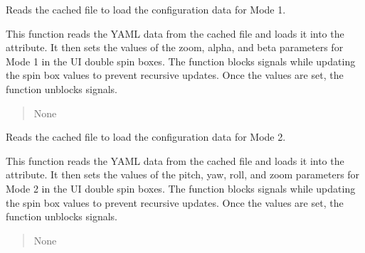 \documentclass[a4paper,10pt,english,openany, oneside]{sphinxmanual}
\begin{document}
\begin{fulllineitems}
\begin{fulllineitems}
\begin{quote}
\begin{description}
\end{description}\end{quote}

\end{fulllineitems}


\begin{fulllineitems}
\label{\detokenize{test:test.AnypointConfig.showing_config_mode_1}}
\pysigstartsignatures
{}
\pysigstopsignatures
\sphinxAtStartPar
Reads the cached file to load the configuration data for Mode 1.

\sphinxAtStartPar
This function reads the YAML data from the cached file and loads it into the
 attribute. It then sets the values of the zoom, alpha,
and beta parameters for Mode 1 in the UI double spin boxes. The function blocks
signals while updating the spin box values to prevent recursive updates. Once the
values are set, the function unblocks signals.
\begin{quote}\begin{description}
\sphinxAtStartPar
None

\end{description}\end{quote}

\end{fulllineitems}


\begin{fulllineitems}
\label{\detokenize{test:test.AnypointConfig.showing_config_mode_2}}
\pysigstartsignatures
{}
\pysigstopsignatures
\sphinxAtStartPar
Reads the cached file to load the configuration data for Mode 2.

\sphinxAtStartPar
This function reads the YAML data from the cached file and loads it into the
 attribute. It then sets the values of the pitch, yaw,
roll, and zoom parameters for Mode 2 in the UI double spin boxes. The function
blocks signals while updating the spin box values to prevent recursive updates.
Once the values are set, the function unblocks signals.
\begin{quote}\begin{description}
\sphinxAtStartPar
None

\end{description}\end{quote}

\end{fulllineitems}


\end{fulllineitems}
\end{document}
